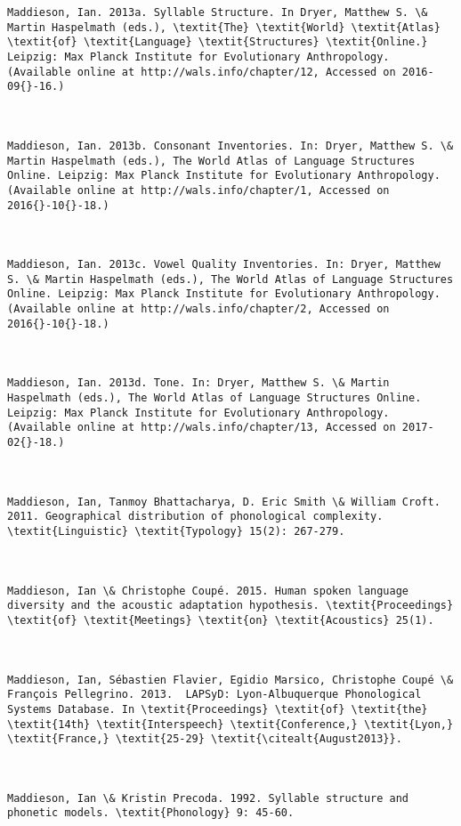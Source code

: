 \begin{verbatim}
Maddieson, Ian. 2013a. Syllable Structure. In Dryer, Matthew S. \& Martin Haspelmath (eds.), \textit{The} \textit{World} \textit{Atlas} \textit{of} \textit{Language} \textit{Structures} \textit{Online.} Leipzig: Max Planck Institute for Evolutionary Anthropology. (Available online at http://wals.info/chapter/12, Accessed on 2016-09{}-16.)



Maddieson, Ian. 2013b. Consonant Inventories. In: Dryer, Matthew S. \& Martin Haspelmath (eds.), The World Atlas of Language Structures Online. Leipzig: Max Planck Institute for Evolutionary Anthropology. (Available online at http://wals.info/chapter/1, Accessed on 2016{}-10{}-18.) 



Maddieson, Ian. 2013c. Vowel Quality Inventories. In: Dryer, Matthew S. \& Martin Haspelmath (eds.), The World Atlas of Language Structures Online. Leipzig: Max Planck Institute for Evolutionary Anthropology. (Available online at http://wals.info/chapter/2, Accessed on 2016{}-10{}-18.)



Maddieson, Ian. 2013d. Tone. In: Dryer, Matthew S. \& Martin Haspelmath (eds.), The World Atlas of Language Structures Online. Leipzig: Max Planck Institute for Evolutionary Anthropology. (Available online at http://wals.info/chapter/13, Accessed on 2017-02{}-18.)



Maddieson, Ian, Tanmoy Bhattacharya, D. Eric Smith \& William Croft. 2011. Geographical distribution of phonological complexity. \textit{Linguistic} \textit{Typology} 15(2): 267-279.



Maddieson, Ian \& Christophe Coupé. 2015. Human spoken language diversity and the acoustic adaptation hypothesis. \textit{Proceedings} \textit{of} \textit{Meetings} \textit{on} \textit{Acoustics} 25(1).



Maddieson, Ian, Sébastien Flavier, Egidio Marsico, Christophe Coupé \& François Pellegrino. 2013.  LAPSyD: Lyon-Albuquerque Phonological Systems Database. In \textit{Proceedings} \textit{of} \textit{the} \textit{14th} \textit{Interspeech} \textit{Conference,} \textit{Lyon,} \textit{France,} \textit{25-29} \textit{\citealt{August2013}}.



Maddieson, Ian \& Kristin Precoda. 1992. Syllable structure and phonetic models. \textit{Phonology} 9: 45-60.




\end{verbatim}
